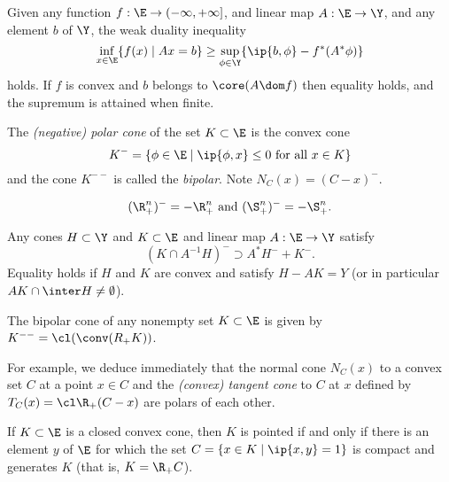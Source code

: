 \documentclass[../borwein-lewis_notes.tex]{subfiles}
\begin{document}
\begin{corollary}
Given any function $f:\E\to(-\infty,+\infty]$, and linear map 
$A:\E\to\Y$, and any element $b$ of $\Y$, the weak duality inequality 
\begin{equation*}
\inf_{x\in\E}\{f(x)\mid Ax=b\} \geq \sup_{\phi\in\Y}\{\ip{b,\phi}
- f^*(A^*\phi)\}
\end{equation*}
holds. If $f$ is convex and $b$ belongs to $\core(A\dom f)$ then 
equality holds, and the supremum is attained when finite. 
\label{3.3.11}
\end{corollary}
The \textit{(negative) polar cone} of the set $K\subset\E$ is the 
convex cone 
\begin{equation*}
K^- = \{\phi\in\E\mid\ip{\phi,x}\leq 0\text{ for all }x\in K\}
\end{equation*}
and the cone $K^{--}$ is called the \textit{bipolar}. Note 
$N_C(x) = (C-x)^-$.
\begin{proposition}
\begin{equation*}
(\R_+^n)^- = -\R_+^n\text{ and }(\S_+^n)^- = -\S_+^n.
\end{equation*}
\label{3.3.12}
\end{proposition}
\begin{corollary}
Any cones $H\subset \Y$ and $K\subset\E$ and linear map $A:\E\to\Y$ 
satisfy 
\begin{equation*}
(K\cap A^{-1}H)^- \supset A^* H^- + K^-.
\end{equation*}
Equality holds if $H$ and $K$ are convex and satisfy $H-AK=Y$ 
(or in particular $AK\cap\inter H\neq \emptyset$).
\label{3.3.13}
\end{corollary}
\begin{theorem}
The bipolar cone of any nonempty set $K\subset\E$ is given by $K^{--}=
\cl(\conv(R_+K))$.
\label{3.3.14}
\end{theorem}
For example, we deduce immediately that the normal cone $N_C(x)$ to 
a convex set $C$ at a point $x\in C$ and the \textit{(convex) tangent 
cone} to $C$ at $x$ defined by $T_C(x) = \cl\R_+(C-x)$ are polars of 
each other.
\begin{theorem}
If $K\subset\E$ is a closed convex cone, then $K$ is pointed if and only
if there is an element $y$ of $\E$ for which the set $C=\{x\in K\mid 
\ip{x,y}=1\}$ is compact and generates $K$ (that is, $K=\R_+C$).
\label{3.3.15}
\end{theorem}
\end{document}
